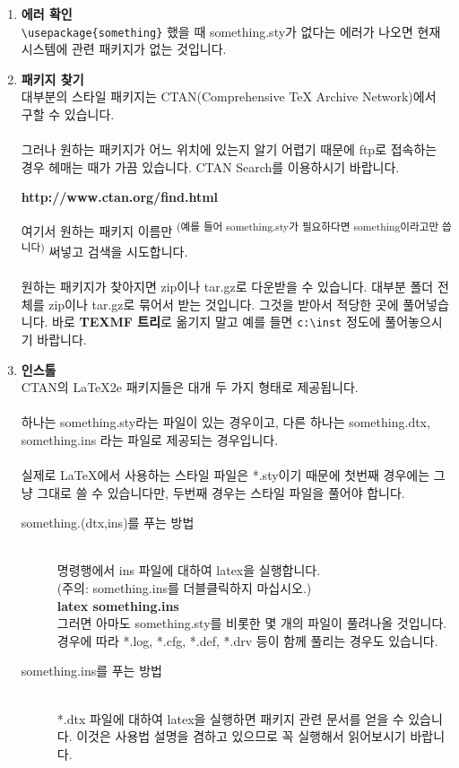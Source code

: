 	\begin{enumerate}[{(}1{)}]
	\item 	\textbf{에러 확인} \\
			\verb|\usepackage{something}| 했을 때 
			something.sty가 없다는 에러가 나오면 현재 시스템에 관련 패키지가 없는 것입니다. 

	\item  	\textbf{패키지 찾기} \\
			대부분의 스타일 패키지는 CTAN(Comprehensive TeX Archive Network)에서 구할 수 있습니다. 
			\\ \\
			그러나 원하는 패키지가 어느 위치에 있는지 알기 어렵기 때문에 ftp로 접속하는 경우 헤매는 때가 가끔 있습니다.
			CTAN Search를 이용하시기 바랍니다. 			
			
			\textbf{http://www.ctan.org/find.html}
			
			여기서 원하는 패키지 이름만
			\textsuperscript{(예를 들어 something.sty가 필요하다면 something이라고만 씁니다)} 써넣고 검색을 시도합니다. 
			\\ \\
			원하는 패키지가 찾아지면 zip이나 tar.gz로 다운받을 수 있습니다. 
			대부분 폴더 전체를 zip이나 tar.gz로 묶어서 받는 것입니다.
			그것을 받아서 적당한 곳에 풀어넣습니다. 
			바로 \textbf{TEXMF 트리}로 옮기지 말고 예를 들면 \verb|c:\inst| 정도에 풀어놓으시기 바랍니다. 
	\clearpage
	\item  	\textbf{인스톨} \\
			CTAN의 LaTeX2e 패키지들은 대개 두 가지 형태로 제공됩니다. \\ \\
			하나는 something.sty라는 파일이 있는 경우이고,  
			다른 하나는 something.dtx, something.ins 라는 파일로 제공되는 경우입니다. 
			\\ \\
			실제로 LaTeX에서 사용하는 스타일 파일은 *.sty이기 때문에 
			첫번째 경우에는 그냥 그대로 쓸 수 있습니다만, 두번째 경우는 스타일 파일을 풀어야 합니다.
			\begin{description}
			\item 	[something.(dtx,ins)를 푸는 방법] \hfill \\
					명령행에서 ins 파일에 대하여 latex을 실행합니다. \\
					(주의: something.ins를 더블클릭하지 마십시오.) \\
					 \textbf{latex something.ins} \\
					그러면 아마도 something.sty를 비롯한 몇 개의 파일이 풀려나올 것입니다. 
					경우에 따라 *.log, *.cfg, *.def, *.drv 등이 함께 풀리는 경우도 있습니다.
			\item 	[something.ins를 푸는 방법] \hfill \\
					*.dtx 파일에 대하여 latex을 실행하면 패키지 관련 문서를 얻을 수 있습니다.
					이것은 사용법 설명을 겸하고 있으므로 꼭 실행해서 읽어보시기 바랍니다.
	

\end{description}
\end{enumerate}
